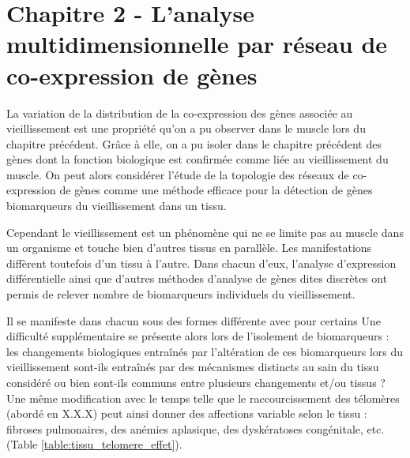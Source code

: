 \chapter{Chapitre 2 - L'analyse multidimensionnelle par réseau de co-expression de gènes}
\label{chapter:multidim}


La variation de la distribution de la co-expression des gènes associée au vieillissement est une propriété qu'on a pu observer dans le muscle lors du chapitre précédent. Grâce à elle, on a pu isoler dans le chapitre précédent des gènes dont la fonction biologique est confirmée comme liée au vieillissement du muscle. On peut alors considérer l'étude de la topologie des réseaux de co-expression de gènes comme une méthode efficace pour la détection de gènes biomarqueurs du vieillissement dans un tissu. 

Cependant le vieillissement est un phénomène qui ne se limite pas au muscle dans un organisme et touche bien d'autres tissus en parallèle. Les manifestations diffèrent toutefois d'un tissu à l'autre.
Dans chacun d'eux, l'analyse d'expression différentielle ainsi que d'autres méthodes d'analyse de gènes dites discrètes \cite{Barabasi2004} ont permis de relever nombre de biomarqueurs individuels du vieillissement. 

Il se manifeste dans chacun sous des formes  différente avec pour certains
Une difficulté supplémentaire se présente alors lors de l'isolement de biomarqueurs : les changements biologiques entraînés par l'altération de ces biomarqueurs lors du vieillissement sont-ils 
entraînés par des mécanismes distincts au sain du tissu considéré ou bien sont-ils communs entre plusieurs changements et/ou tissus ?
Une même modification avec le temps telle que le raccourcissement des télomères (abordé en X.X.X) peut ainsi donner des affections variable selon le tissu : fibroses pulmonaires, des anémies aplasique, des dyskératoses congénitale, etc. \cite{Armanios2012} (Table \ref{table:tissu_telomere_effet}). 

